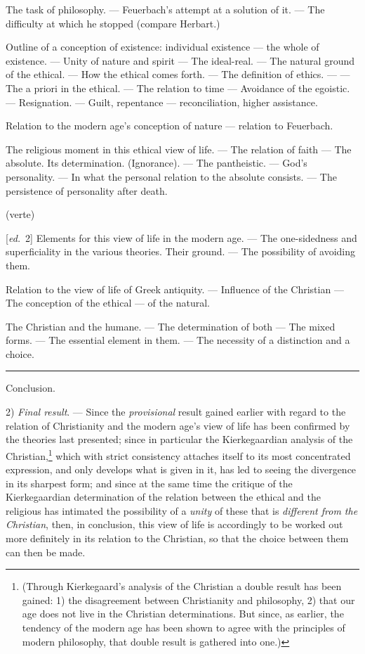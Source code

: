 \documentclass[12pt,a4paper,openany]{book}
\newcommand{\kpage}[1]{\marginnote{\footnotesize\textit{[#1]}}}
\newcommand{\ed}[1]{{\small[\textit{ed.}\ #1]}}
\newcommand{\lecture}[1]{\par\bigskip\noindent{\large #1}\par\nobreak\medskip}
\newcommand{\sepline}{\par\begin{center}\rule{2cm}{0.4pt}\end{center}\par}
\begin{document}
The task of philosophy. --- Feuerbach's attempt at a solution of it.
\kpage{180}--- The difficulty at which he stopped (compare
Herbart.)

Outline of a conception of existence: individual existence --- the whole
of existence. --- Unity of nature and spirit --- The ideal-real.
--- The natural ground of the ethical. --- How the ethical comes
forth. --- The definition of ethics. --- --- The a priori in the ethical.
--- The relation to time --- Avoidance of the egoistic. --- Resignation.
--- Guilt, repentance --- reconciliation, higher assistance.

Relation to the modern age's conception of nature --- relation to Feuerbach.

The religious moment in this ethical view of life. --- The relation of faith
--- The absolute. Its determination. (Ignorance). --- The
pantheistic. --- God's personality. --- In what the personal relation
to the absolute consists. --- The persistence of personality after
death.

(verte)

\ed{2} Elements for this view of life in the modern age. --- The one-sidedness
and superficiality in the various theories. Their ground.
--- The possibility of avoiding them.

Relation to the view of life of Greek antiquity. --- Influence of
the Christian --- The conception of the ethical --- of the natural.

The Christian and the humane. --- The determination of both --- The mixed forms.
--- The essential element in them. --- The necessity
of a distinction and a choice.

\sepline

Conclusion.

\lecture{\ed{76.7 continued} Lecture 30}

2) \emph{Final result}. --- Since the \emph{provisional} result gained earlier with
regard to the relation of Christianity and the modern age's view of life
has been confirmed by the theories last presented; since
in particular the Kierkegaardian analysis of the Christian,\footnote[143]{(Through Kierkegaard's analysis of the Christian a double result has been gained: 1) the disagreement between Christianity and philosophy, 2) that our age does not live in the Christian determinations. But since, as earlier, the tendency of the modern age has been shown to agree with the principles of modern philosophy, that double result is gathered into one.)} which with
\kpage{181}strict consistency attaches itself to its most concentrated expression,
and only develops what is given in it, has led to seeing the divergence
in its sharpest form; and since at the same time the critique of the
Kierkegaardian determination of the relation between the ethical and the
religious has intimated the possibility of a \emph{unity} of these that is \emph{different
from the Christian}, then, in conclusion, this view of life is accordingly to be
worked out more definitely in its relation to the Christian, so that the choice
between them can then be made.
\end{document}
